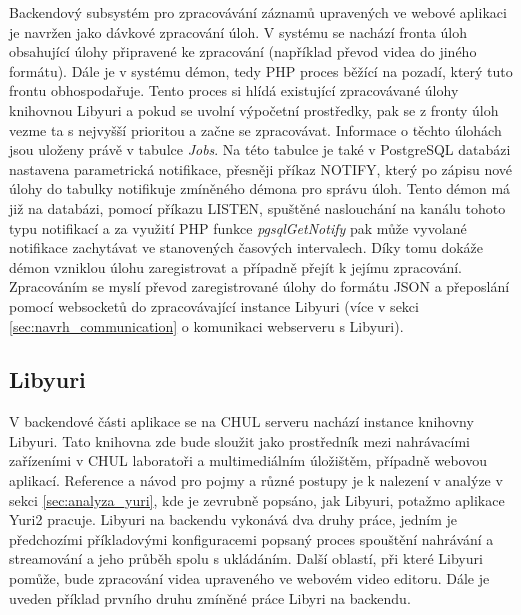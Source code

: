 \documentclass[thesis=M,czech]{FITthesis}[2012/06/26]
\begin{document}
Backendový subsystém pro zpracovávání záznamů upravených ve webové aplikaci je navržen jako dávkové zpracování úloh. V systému se nachází fronta úloh obsahující úlohy připravené ke zpracování (například převod videa do jiného formátu). Dále je v systému démon, tedy PHP proces běžící na pozadí, který tuto frontu obhospodařuje. Tento proces si hlídá existující zpracovávané úlohy knihovnou Libyuri a pokud se uvolní výpočetní prostředky, pak se z fronty úloh vezme ta s nejvyšší prioritou a začne se zpracovávat. Informace o těchto úlohách jsou uloženy právě v tabulce \textit{Jobs}. Na této tabulce je také v PostgreSQL databázi nastavena parametrická notifikace, přesněji příkaz NOTIFY, který po zápisu nové úlohy do tabulky notifikuje zmíněného démona pro správu úloh. Tento démon má již na databázi, pomocí příkazu LISTEN, spuštěné naslouchání na kanálu tohoto typu notifikací a za využití PHP funkce \textit{pgsqlGetNotify} pak může vyvolané notifikace zachytávat ve stanovených časových intervalech. Díky tomu dokáže démon vzniklou úlohu zaregistrovat a případně přejít k jejímu zpracování. Zpracováním se myslí převod zaregistrované úlohy do formátu JSON a přeposlání pomocí websocketů do zpracovávající instance Libyuri (více v sekci \ref{sec:navrh_communication} o komunikaci webserveru s Libyuri).

\subsection{Libyuri} \label{subsec:navrh_backend_libyuri}
V backendové části aplikace se na CHUL serveru nachází instance knihovny Libyuri. Tato knihovna zde bude sloužit jako prostředník mezi nahrávacími zařízeními v CHUL laboratoři a multimediálním úložištěm, případně webovou aplikací. Reference a návod pro pojmy a různé postupy je k nalezení v analýze v sekci \ref{sec:analyza_yuri}, kde je zevrubně popsáno, jak Libyuri, potažmo aplikace Yuri2 pracuje.	Libyuri na backendu vykonává dva druhy práce, jedním je předchozími příkladovými konfiguracemi popsaný proces spouštění nahrávání a streamování a jeho průběh spolu s ukládáním. Další oblastí, při které Libyuri pomůže, bude zpracování videa upraveného ve webovém video editoru. Dále je uveden příklad prvního druhu zmíněné práce Libyri na backendu.
\end{document}
